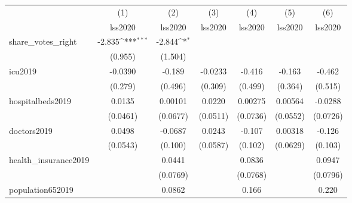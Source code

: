 {
\def\sym#1{\ifmmode^{#1}\else\(^{#1}\)\fi}
\begin{tabular}{l*{6}{c}}
\hline\hline
            &\multicolumn{1}{c}{(1)}&\multicolumn{1}{c}{(2)}&\multicolumn{1}{c}{(3)}&\multicolumn{1}{c}{(4)}&\multicolumn{1}{c}{(5)}&\multicolumn{1}{c}{(6)}\\
            &\multicolumn{1}{c}{lss2020}&\multicolumn{1}{c}{lss2020}&\multicolumn{1}{c}{lss2020}&\multicolumn{1}{c}{lss2020}&\multicolumn{1}{c}{lss2020}&\multicolumn{1}{c}{lss2020}\\
\hline
share\_votes\_right &      -2.835\sym{***}&      -2.844\sym{*}  &                     &                     &                     &                     \\
            &     (0.955)         &     (1.504)         &                     &                     &                     &                     \\
[1em]
icu2019     &     -0.0390         &      -0.189         &     -0.0233         &      -0.416         &      -0.163         &      -0.462         \\
            &     (0.279)         &     (0.496)         &     (0.309)         &     (0.499)         &     (0.364)         &     (0.515)         \\
[1em]
hospitalbeds2019 &      0.0135         &     0.00101         &      0.0220         &     0.00275         &     0.00564         &     -0.0288         \\
            &    (0.0461)         &    (0.0677)         &    (0.0511)         &    (0.0736)         &    (0.0552)         &    (0.0726)         \\
[1em]
doctors2019 &      0.0498         &     -0.0687         &      0.0243         &      -0.107         &     0.00318         &      -0.126         \\
            &    (0.0543)         &     (0.100)         &    (0.0587)         &     (0.102)         &    (0.0629)         &     (0.103)         \\
[1em]
health\_insurance2019&                     &      0.0441         &                     &      0.0836         &                     &      0.0947         \\
            &                     &    (0.0769)         &                     &    (0.0768)         &                     &    (0.0796)         \\
[1em]
population652019&                     &      0.0862         &                     &       0.166         &                     &       0.220         \\

\end{tabular}}
